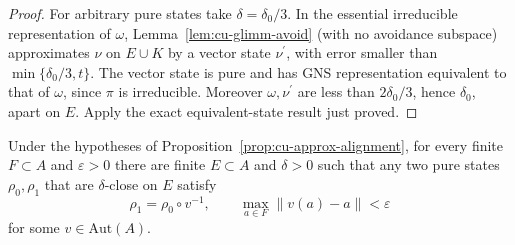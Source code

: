 \begin{proof}
For arbitrary pure states take $\delta=\delta_0/3$. In the essential
irreducible representation of $\omega$, Lemma~\ref{lem:cu-glimm-avoid} (with no
avoidance subspace) approximates $\nu$ on $E\cup K$ by a vector state $\nu^{\prime }$, with error smaller than $\min\{\delta_0/3,t\}$. The vector
state is pure and has GNS representation equivalent to that of $\omega$,
since $\pi$ is irreducible. Moreover $\omega,\nu^{\prime }$ are less than $2\delta_0/3$, hence $\delta_0$, apart on $E$. Apply the exact
equivalent-state result just proved.
\end{proof}

\begin{theorem}\label{thm:cu-alignment}
 Under the hypotheses of Proposition~\ref{prop:cu-approx-alignment}, for every finite $F\subset A$ and $\varepsilon>0$
there are finite $E\subset A$ and $\delta>0$ such that any two pure states $\rho_0,\rho_1$ that are $\delta$-close on $E$ satisfy 
\begin{equation*}
\rho_1=\rho_0\circ v^{-1},\qquad \max_{a\in
F}\left\|v(a)-a\right\|<\varepsilon
\end{equation*}
for some $v\in\mathrm{Aut}(A)$.
\end{theorem}

